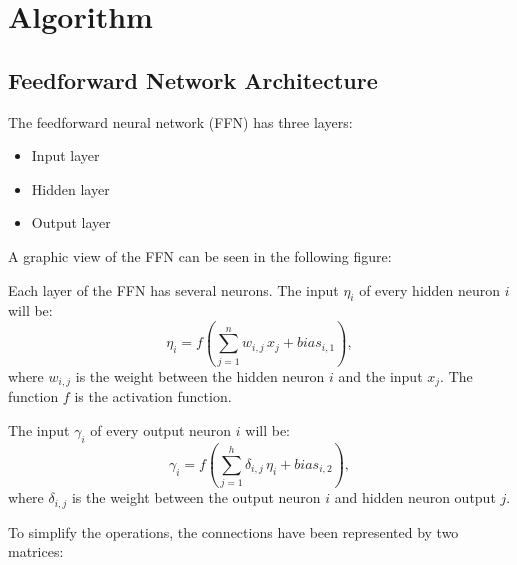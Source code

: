 \section{Algorithm}

\subsection{Feedforward Network Architecture}

The feedforward neural network (FFN) has three layers:
\begin{itemize}
  \item Input layer
  \item Hidden layer
  \item Output layer
\end{itemize}

A graphic view of the FFN can be seen in the following figure:


Each layer of the FFN has several neurons.
The input $\eta_{i}$ of every hidden neuron $i$ will be:
\[
  \eta_{i} =
  f\left(
    \sum_{j=1}^{n}
    w_{i,j}\,x_j + bias_{i,1}
  \right),
\]
where $w_{i,j}$ is the weight
between the hidden neuron $i$ and the input $x_j$.
The function $f$ is the activation function.

The input $\gamma_{i}$ of every output neuron $i$ will be:
\[
  \gamma_{i} =
  f\left(
    \sum_{j=1}^{h}
    \delta_{i,j}\,\eta_i + bias_{i,2}
  \right),
\]
where $\delta_{i,j}$ is the weight
between the output neuron $i$ and hidden neuron output $j$.

To simplify the operations, the connections have been represented by two matrices:

